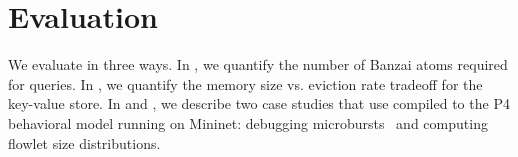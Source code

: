 \section{Evaluation}
\label{sec:eval}



We evaluate \TheSystem in three ways. In , we quantify the
number of Banzai atoms required for \TheSystem queries. In ,
we quantify the memory size vs. eviction rate tradeoff for the key-value store.
In  and , we describe two case
studies that use \TheSystem compiled to the P4 behavioral model running on
Mininet: debugging microbursts~\cite{tpp} and computing flowlet size
distributions.





